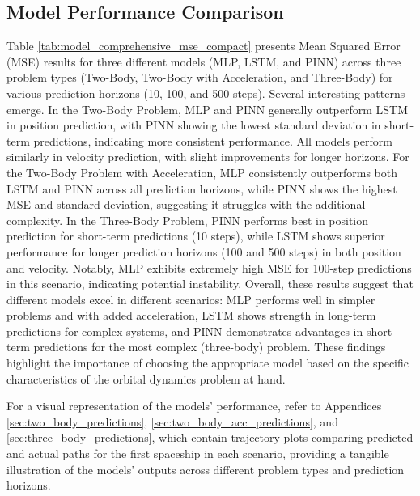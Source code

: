 \documentclass[11pt,a4paper, twocolumn]{article}
\begin{document}
\subsection{Model Performance Comparison}


Table \ref{tab:model_comprehensive_mse_compact} presents Mean Squared Error (MSE) results for three different models (MLP, LSTM, and PINN) across three problem types (Two-Body, Two-Body with Acceleration, and Three-Body) for various prediction horizons (10, 100, and 500 steps). Several interesting patterns emerge. In the Two-Body Problem, MLP and PINN generally outperform LSTM in position prediction, with PINN showing the lowest standard deviation in short-term predictions, indicating more consistent performance. All models perform similarly in velocity prediction, with slight improvements for longer horizons. For the Two-Body Problem with Acceleration, MLP consistently outperforms both LSTM and PINN across all prediction horizons, while PINN shows the highest MSE and standard deviation, suggesting it struggles with the additional complexity. In the Three-Body Problem, PINN performs best in position prediction for short-term predictions (10 steps), while LSTM shows superior performance for longer prediction horizons (100 and 500 steps) in both position and velocity. Notably, MLP exhibits extremely high MSE for 100-step predictions in this scenario, indicating potential instability. Overall, these results suggest that different models excel in different scenarios: MLP performs well in simpler problems and with added acceleration, LSTM shows strength in long-term predictions for complex systems, and PINN demonstrates advantages in short-term predictions for the most complex (three-body) problem. These findings highlight the importance of choosing the appropriate model based on the specific characteristics of the orbital dynamics problem at hand.

For a visual representation of the models' performance, refer to Appendices \ref{sec:two_body_predictions}, \ref{sec:two_body_acc_predictions}, and \ref{sec:three_body_predictions}, which contain trajectory plots comparing predicted and actual paths for the first spaceship in each scenario, providing a tangible illustration of the models' outputs across different problem types and prediction horizons.
\end{document}
